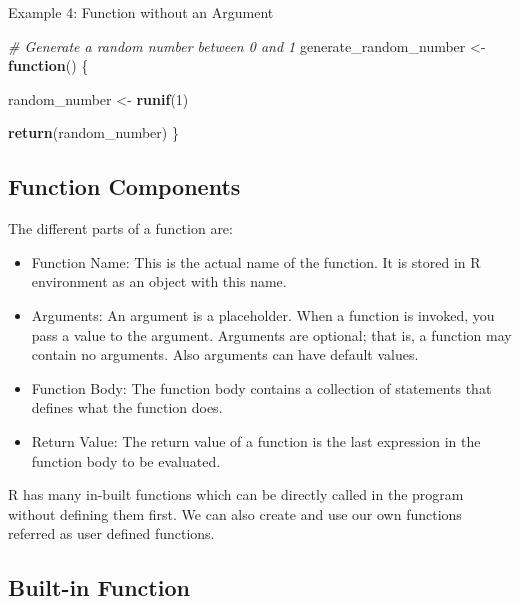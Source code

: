 \documentclass[
]{book}
\newenvironment{Shaded}{\begin{snugshade}}{\end{snugshade}}
\newcommand{\CommentTok}[1]{\textcolor[rgb]{0.56,0.35,0.01}{\textit{#1}}}
\newcommand{\ControlFlowTok}[1]{\textcolor[rgb]{0.13,0.29,0.53}{\textbf{#1}}}
\newcommand{\DecValTok}[1]{\textcolor[rgb]{0.00,0.00,0.81}{#1}}
\newcommand{\FunctionTok}[1]{\textcolor[rgb]{0.13,0.29,0.53}{\textbf{#1}}}
\newcommand{\NormalTok}[1]{#1}
\newcommand{\OtherTok}[1]{\textcolor[rgb]{0.56,0.35,0.01}{#1}}
\begin{document}
Example 4: Function without an Argument

\begin{Shaded}
\begin{Highlighting}[]
\CommentTok{\# Generate a random number between 0 and 1}
\NormalTok{generate\_random\_number }\OtherTok{\textless{}{-}} \ControlFlowTok{function}\NormalTok{() \{}
  
\NormalTok{  random\_number }\OtherTok{\textless{}{-}} \FunctionTok{runif}\NormalTok{(}\DecValTok{1}\NormalTok{)}
  
  \FunctionTok{return}\NormalTok{(random\_number)}
\NormalTok{\}}
\end{Highlighting}
\end{Shaded}

\hypertarget{function-components}{%
\subsection*{Function Components}\label{function-components}}

The different parts of a function are:

\begin{itemize}
\item
  Function Name: This is the actual name of the function. It is stored in R environment as an object with this name.
\item
  Arguments: An argument is a placeholder. When a function is invoked, you pass a value to the argument. Arguments are optional; that is, a function may contain no arguments. Also arguments can have default values.
\item
  Function Body: The function body contains a collection of statements that defines what the function does.
\item
  Return Value: The return value of a function is the last expression in the function body to be evaluated.
\end{itemize}

R has many in-built functions which can be directly called in the program without defining them first. We can also create and use our own functions referred as user defined functions.

\hypertarget{built-in-function}{%
\subsection*{Built-in Function}\label{built-in-function}}
\end{document}
